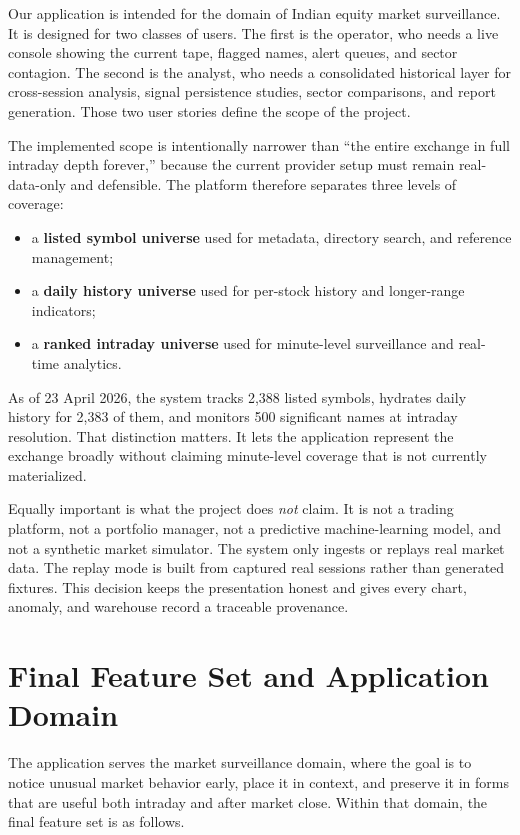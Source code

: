 \documentclass[11pt,a4paper]{article}
\begin{document}
Our application is intended for the domain of Indian equity market surveillance. It is designed for two classes of users. The first is the operator, who needs a live console showing the current tape, flagged names, alert queues, and sector contagion. The second is the analyst, who needs a consolidated historical layer for cross-session analysis, signal persistence studies, sector comparisons, and report generation. Those two user stories define the scope of the project.

The implemented scope is intentionally narrower than ``the entire exchange in full intraday depth forever,'' because the current provider setup must remain real-data-only and defensible. The platform therefore separates three levels of coverage:
\begin{itemize}
    \item a \textbf{listed symbol universe} used for metadata, directory search, and reference management;
    \item a \textbf{daily history universe} used for per-stock history and longer-range indicators;
    \item a \textbf{ranked intraday universe} used for minute-level surveillance and real-time analytics.
\end{itemize}

As of 23 April 2026, the system tracks 2,388 listed symbols, hydrates daily history for 2,383 of them, and monitors 500 significant names at intraday resolution. That distinction matters. It lets the application represent the exchange broadly without claiming minute-level coverage that is not currently materialized.

Equally important is what the project does \emph{not} claim. It is not a trading platform, not a portfolio manager, not a predictive machine-learning model, and not a synthetic market simulator. The system only ingests or replays real market data. The replay mode is built from captured real sessions rather than generated fixtures. This decision keeps the presentation honest and gives every chart, anomaly, and warehouse record a traceable provenance.

\section{Final Feature Set and Application Domain}
The application serves the market surveillance domain, where the goal is to notice unusual market behavior early, place it in context, and preserve it in forms that are useful both intraday and after market close. Within that domain, the final feature set is as follows.
\end{document}
